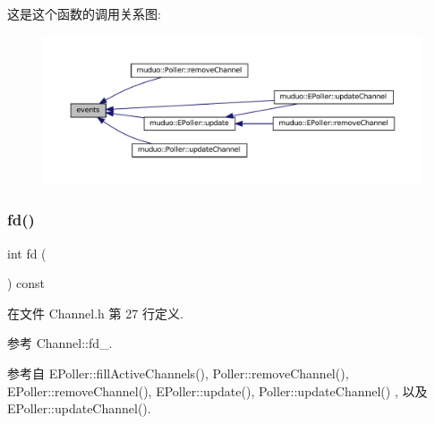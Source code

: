 这是这个函数的调用关系图\+:
\nopagebreak
\begin{figure}[H]
\begin{center}
\leavevmode
\includegraphics[width=350pt]{classmuduo_1_1Channel_ae4f693c8725a3c04d41dee8bb4266f7e_icgraph}
\end{center}
\end{figure}
\mbox{\label{classmuduo_1_1Channel_ace5c4071ee8893901bb818bbcab739b2}} 
\subsubsection{\texorpdfstring{fd()}{fd()}}
{\footnotesize\ttfamily int fd (\begin{DoxyParamCaption}{ }\end{DoxyParamCaption}) const\hspace{0.3cm}{\ttfamily [inline]}}



在文件 Channel.\+h 第 27 行定义.



参考 Channel\+::fd\+\_\+.



参考自 E\+Poller\+::fill\+Active\+Channels(), Poller\+::remove\+Channel(), E\+Poller\+::remove\+Channel(), E\+Poller\+::update(), Poller\+::update\+Channel() , 以及 E\+Poller\+::update\+Channel().

